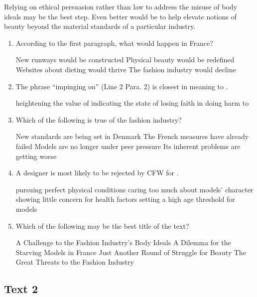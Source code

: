 Relying on ethical persuasion rather than law to address the misuse of
body ideals may be the best step. Even better would be to help elevate
notions of beauty beyond the material standards of a particular
industry.


\begin{enumerate}[resume]
	\item
According to the first paragraph, what would happen in
France?


\fourchoices
{New runways would be constructed}
{Physical beauty would be redefined}
{Websites about dieting would thrive}
{The fashion industry would decline}



\item
The phrase ``impinging on'' (Line 2 Para. 2) is closest in
meaning to \lineread.


\fourchoices
{heightening the value of}
{indicating the state of}
{losing faith in}
{doing harm to}


\item
Which of the following is true of the fashion
industry?


\fourchoices
{New standards are being set in Denmark}
{The French measures have already failed}
{Models are no longer under peer pressure}
{Its inherent problems are getting worse}



\item
A designer is most likely to be rejected by CFW for \lineread.


\fourchoices
{pursuing perfect physical conditions}
{caring too much about models' character}
{showing little concern for health factors}
{setting a high age threshold for models}


\item
Which of the following may be the best title of the
text?


\fourchoices
{A Challenge to the Fashion Industry's Body Ideals}
{A Dilemma for the Starving Models in France}
{Just Another Round of Struggle for Beauty}
{The Great Threats to the Fashion Industry}


\end{enumerate}


\newpage
\subsection{Text 2}



